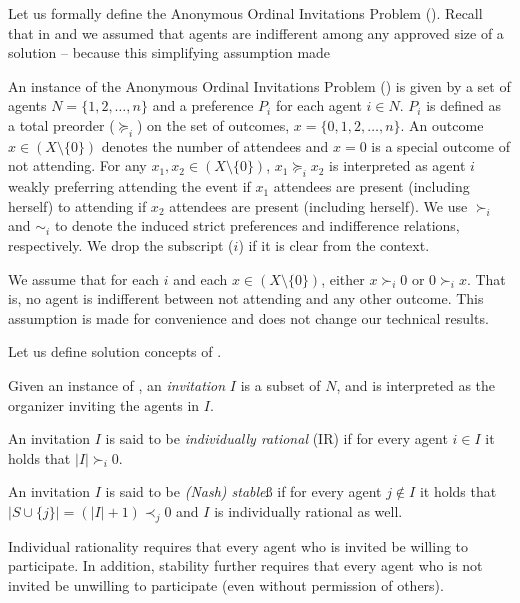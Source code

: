 Let us formally define the Anonymous Ordinal Invitations Problem (\AOIP).
Recall that in \GASPs and \SIPs we assumed that agents are indifferent among any approved size of a solution -- because this simplifying assumption made 

\begin{definition}
An instance of the Anonymous Ordinal Invitations Problem (\AOIP) is given by a set of agents $N = \{1, 2, \dots, n\}$ and a preference $P_i$ for each agent $i\in N$. $P_i$ is defined as a total preorder ($\succeq_i$) on the set of outcomes, $x = \{0, 1, 2, \dots, n\}$. An outcome $x\in (X\setminus\{0\})$ denotes the number of attendees and $x = 0$ is a special outcome of not attending. 
For any $x_1, x_2\in (X \setminus\{0\})$, $x_1 \succeq_i x_2$ is interpreted as agent $i$ weakly preferring attending the event if $x_1$ attendees are present (including herself) to attending if $x_2$ attendees are present (including herself).
We use $\succ_i$ and $\sim_i$ to denote the induced strict preferences and indifference relations, respectively. 
We drop the subscript ($i$) if it is clear from the context.
\end{definition}

We assume that for each $i$ and each $x\in (X\setminus\{0\})$, either $x \succ_i 0$ or $0 \succ_i x$. That is, no agent is indifferent between not attending and any other outcome. This assumption is made for convenience and does not change our technical results.

Let us define solution concepts of \AOIP.

\begin{definition} \label{GT:def:invitation}
Given an instance of \AOIP, an \emph{invitation} $I$ is a subset of $N$, and is interpreted as the organizer inviting the agents in $I$. 

An invitation $I$ is said to be \emph{individually rational} (IR) if for every agent $i\in I$ it holds that $|I| \succ_i 0$. 

An invitation $I$ is said to be \emph{(Nash) stable}ß if for every agent $j\not\in I$ it holds that $|S \cup \{j\}| = (|I| + 1) \prec_j 0$ and $I$ is individually rational as well.
\end{definition}
Individual rationality requires that every agent who is invited be willing to participate. In addition, stability further requires that every agent who is not invited be unwilling to participate (even without permission of others).


